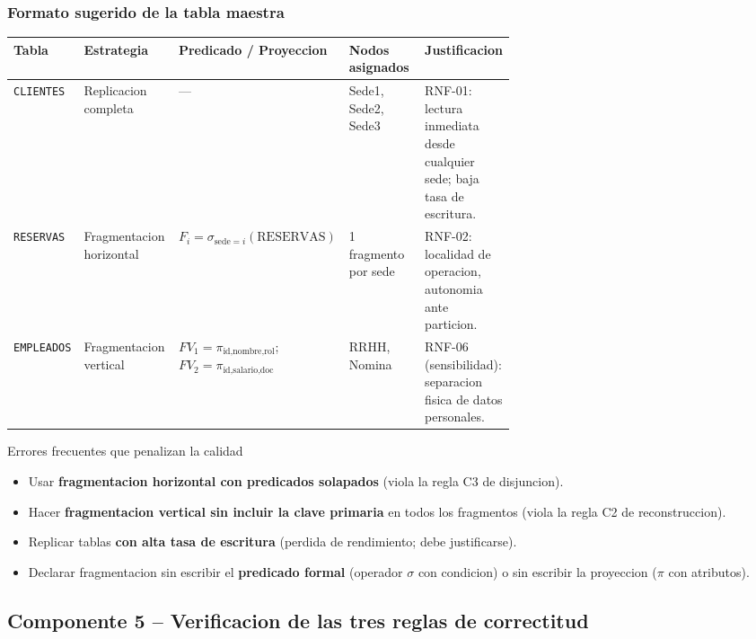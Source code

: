 \documentclass[11pt,a4paper]{article}
\newcommand{\codigo}[1]{\texttt{\textcolor{uteqBlue}{#1}}}
\begin{document}
\subsubsection{Formato sugerido de la tabla maestra}

\renewcommand{\arraystretch}{1.3}
\begin{xltabular}{\linewidth}{@{}lp{0.20\linewidth}p{0.27\linewidth}p{0.18\linewidth}X@{}}
\toprule
\textbf{Tabla} & \textbf{Estrategia} & \textbf{Predicado / Proyeccion} & \textbf{Nodos asignados} & \textbf{Justificacion} \\
\midrule
\codigo{CLIENTES} & Replicacion completa & --- & Sede1, Sede2, Sede3 & RNF-01: lectura inmediata desde cualquier sede; baja tasa de escritura. \\
\codigo{RESERVAS} & Fragmentacion horizontal & $F_i = \sigma_{\text{sede}=i}(\text{RESERVAS})$ & 1 fragmento por sede & RNF-02: localidad de operacion, autonomia ante particion. \\
\codigo{EMPLEADOS} & Fragmentacion vertical & $FV_1 = \pi_{\text{id,nombre,rol}}$; $FV_2 = \pi_{\text{id,salario,doc}}$ & RRHH, Nomina & RNF-06 (sensibilidad): separacion fisica de datos personales. \\
\bottomrule
\end{xltabular}

\begin{cajacritica}{Errores frecuentes que penalizan la calidad}
\begin{itemize}
\item Usar \textbf{fragmentacion horizontal con predicados solapados} (viola la regla C3 de disjuncion).
\item Hacer \textbf{fragmentacion vertical sin incluir la clave primaria} en todos los fragmentos (viola la regla C2 de reconstruccion).
\item Replicar tablas \textbf{con alta tasa de escritura} (perdida de rendimiento; debe justificarse).
\item Declarar fragmentacion sin escribir el \textbf{predicado formal} (operador $\sigma$ con condicion) o sin escribir la proyeccion ($\pi$ con atributos).
\end{itemize}
\end{cajacritica}

\subsection{Componente 5 -- Verificacion de las tres reglas de correctitud}
\end{document}
